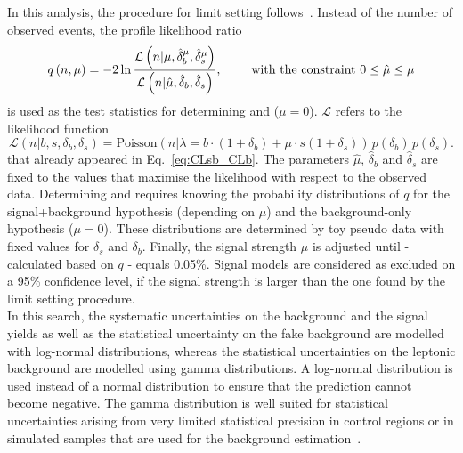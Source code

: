 In this analysis, the procedure for limit setting follows~\cite{bib:LimitSetting_Higgs}.
Instead of the number of observed events, the profile likelihood ratio 
\begin{equation}
q \left( n, \mu \right) = -2 \ln \frac{\mathcal{L}\left(  n | \mu, \hat{\delta}_b^{\mu}, \hat{\delta}_s^{\mu} \right)}{\mathcal{L}\left(  n  | \hat{\mu}, \hat{\delta}_b, \hat{\delta}_s \right)}, \text{   \qquad with the constraint } 0\leq \hat{\mu} \leq \mu
\end{equation}
is used as the test statistics for determining \CLsb and \CLb ($\mu=0$). $\mathcal{L} $ refers to the likelihood function
\begin{equation}
\mathcal{L} \left(n | b,s,\delta_b, \delta_s \right)=  \text{Poisson}\left( n |\lambda = b \cdot (1+\delta_b)+\mu\cdot s  (1+\delta_s)  \right)\, p\left(\delta_b\right)\, p\left(\delta_s\right).
\end{equation}
that already appeared in Eq.~\eqref{eq:CLsb_CLb}.
The parameters $\hat{\mu}$, $\hat{\delta}_b$ and $\hat{\delta}_s$ are fixed to the values that maximise the likelihood with respect to the observed data.
Determining \CLsb and \CLb requires knowing the probability distributions of $q$ for the signal+background hypothesis (depending on $\mu$) and the background-only hypothesis ($\mu = 0$).  
These distributions are determined by toy pseudo data with fixed values for $\delta_s$ and $\delta_b$.
Finally, the signal strength $\mu$ is adjusted until \CLs - calculated based on $q$ - equals 0.05\%.
Signal models are considered as excluded on a 95\% confidence level, if the signal strength is larger than the one found by the limit setting procedure.\\ 

In this search, the systematic uncertainties on the background and the signal yields as well as the statistical uncertainty on the fake background are modelled with log-normal distributions, 
whereas the statistical uncertainties on the leptonic background are modelled using gamma distributions.
A log-normal distribution is used instead of a normal distribution to ensure that the prediction cannot become negative.
The gamma distribution is well suited for statistical uncertainties arising from very limited statistical precision in control regions or in simulated samples that are used for the background estimation~\cite{bib:CMS:Combine}.

